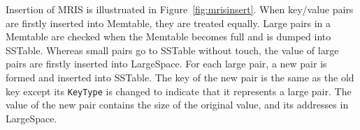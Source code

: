 Insertion of MRIS is illustruated in Figure~\ref{fig:mrisinsert}.
When key/value pairs are firstly inserted into Memtable, they are
treated equally. Large pairs in a Memtable are checked when the
Memtable becomes full and is dumped into SSTable. Whereas small pairs
go to SSTable without touch, the value of large pairs are firstly
inserted into LargeSpace. For each large pair, a new pair is formed
and inserted into SSTable. The key of the new pair is the same as the
old key except its \texttt{KeyType} is changed to indicate that it
represents a large pair.  The value of the new pair contains the size
of the original value, and its addresses in LargeSpace.

